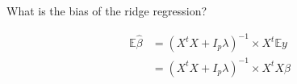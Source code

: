 \begin{frame}[fragile] \frametitle{}

What is the bias of the ridge regression?

\begin{align*}
\mathbb{E} \widehat{\beta} &= (X^t X + I_p \lambda)^{-1} \times X^t \mathbb{E}y \\
&= (X^t X + I_p \lambda)^{-1} \times X^t X \beta
\end{align*}

\end{frame}













